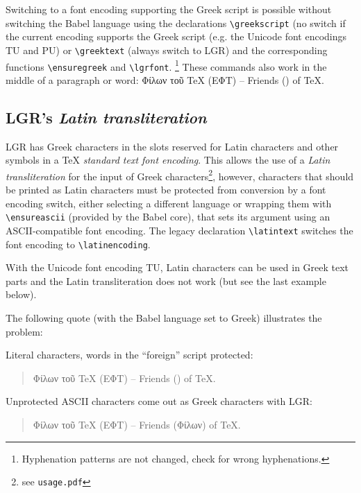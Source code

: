 \documentclass[a4paper]{article}
\newcommand{\file}{\texttt}
\begin{document}
\ifdefined\greekscript
  Switching to a font encoding supporting the Greek script is possible without
  switching the Babel language using the declarations \verb|\greekscript| (no
  switch if the current encoding supports the Greek script (e.g. the Unicode
  font encodings TU and PU) or \verb|\greektext| (always switch to LGR) and the
  corresponding functions \verb|\ensuregreek| and \verb|\lgrfont|.%
    \footnote{Hyphenation patterns are not changed,
              check for wrong hyphenations.}
  These commands also work in the middle of a paragraph or word:
  \greekscript Φίλων τοῦ \textlatin{TeX} (ΕΦΤ) --
  \latintext Friends () of TeX.
\fi


\subsection{LGR's \emph{Latin transliteration}%
            \label{Latin transliteration}}

LGR has Greek characters in the slots reserved for Latin characters and
other symbols in a TeX \emph{standard text font encoding}.
This allows the use of a \emph{Latin transliteration} for the input of Greek
characters\footnote{see \file{usage.pdf}}, however, characters that should
be printed as Latin characters must be protected from conversion by a font
encoding switch, either selecting a different language or wrapping them with
\verb|\ensureascii| (provided by the Babel core), that sets its argument
using an ASCII-compatible font encoding. The legacy declaration
\verb|\latintext| switches the font encoding to \verb|\latinencoding|.

With the Unicode font encoding TU, Latin characters can be used in Greek
text parts and the Latin transliteration does not work (but see the
last example below).

The following quote (with the Babel language set to Greek) illustrates the
problem:

Literal characters, words in the ``foreign'' script protected:
\begin{quote}
  Φίλων τοῦ \textlatin{TeX} (ΕΦΤ) --
  Friends () of TeX.
\end{quote}

Unprotected ASCII characters come out as Greek characters with LGR:
\begin{quote}
  Φίλων τοῦ TeX (ΕΦΤ) -- Friends (Φίλων) of TeX.
\end{quote}
\end{document}
